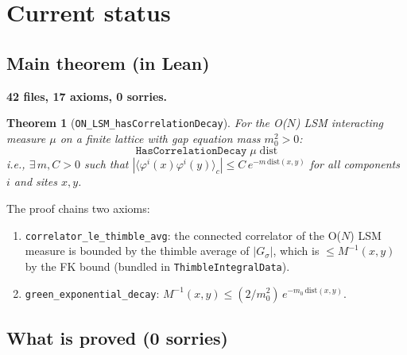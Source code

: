 \documentclass[12pt]{article}
\newtheorem{theorem}{Theorem}
\theoremstyle{definition}
\theoremstyle{remark}
\newcommand{\ph}{\varphi}
\begin{document}
\section{Current status}

\subsection{Main theorem (in Lean)}

\textbf{42 files, 17 axioms, 0 sorries.}

\begin{theorem}[\texttt{ON\_LSM\_hasCorrelationDecay}]
For the O($N$) LSM interacting measure $\mu$ on a finite lattice
with gap equation mass $m_0^2 > 0$:
\begin{equation}
  \texttt{HasCorrelationDecay}\;\mu\;\mathrm{dist}
\end{equation}
i.e., $\exists\,m, C > 0$ such that
$|\langle\ph^i(x)\ph^i(y)\rangle_c| \le C\,e^{-m\,\mathrm{dist}(x,y)}$
for all components~$i$ and sites $x, y$.
\end{theorem}

The proof chains two axioms:
\begin{enumerate}
\item \texttt{correlator\_le\_thimble\_avg}: the connected correlator
  of the O($N$) LSM measure is bounded by the thimble average of
  $|G_\sigma|$, which is $\le M^{-1}(x,y)$ by the FK bound
  (bundled in \texttt{ThimbleIntegralData}).
\item \texttt{green\_exponential\_decay}: $M^{-1}(x,y) \le
  (2/m_0^2)\,e^{-m_0\,\mathrm{dist}(x,y)}$.
\end{enumerate}

\subsection{What is proved (0 sorries)}
\end{document}
